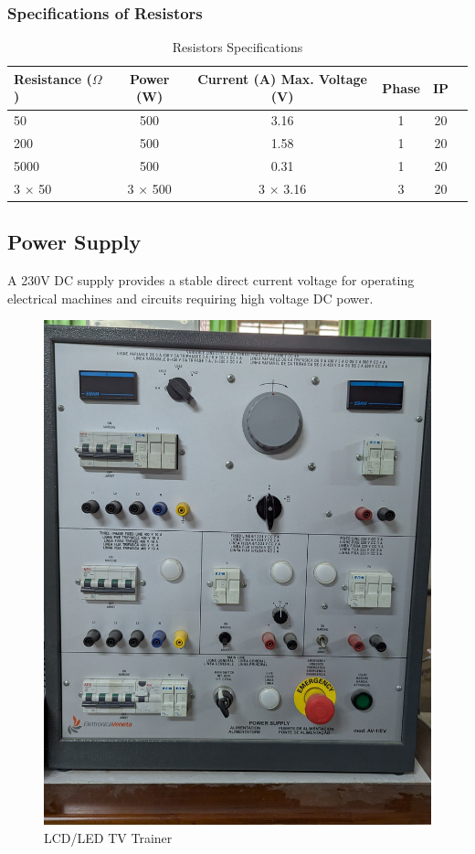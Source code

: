 \documentclass[a4paper,12pt]{article}
\begin{document}
	\subsubsection{Specifications of Resistors}
	\begin{table}[H]
		\centering
		\caption{Resistors Specifications}
		\begin{tabular}{|l|c|c|c|c|c|}
			\hline
			\textbf{Resistance ($\Omega$)} & \textbf{Power (W)} & \textbf{Current (A)} \textbf{Max. Voltage (V)} & \textbf{Phase} & \textbf{IP} \\
			\hline
			50   & 500  & 3.16   & 1 & 20 \\
			200  & 500  & 1.58   & 1 & 20 \\
			5000 & 500  & 0.31   & 1 & 20 \\
			3 × 50  & 3 × 500  & 3 × 3.16   & 3 & 20 \\
			\hline
		\end{tabular}
	\end{table}
	\newpage
	\subsection{Power Supply}
	A 230V DC supply provides a stable direct current voltage for operating electrical machines and circuits requiring high voltage DC power.
			\begin{figure}[H]
			\centering
			\includegraphics[width=.45\linewidth, height=0.35\textheight]{"Images/3"}
			\caption{LCD/LED TV Trainer}
		\end{figure}
\end{document}

